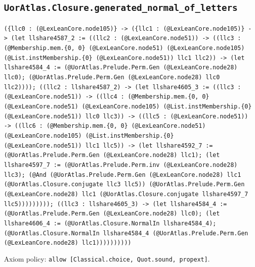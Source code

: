 \documentclass[11pt]{article}
\begin{document}
\subsection*{\texttt{UorAtlas.Closure.generated\_normal\_of\_letters}}
\noindent\texttt{(\{llc0 : (@LexLeanCore.node105)\} -> (\{llc1 : (@LexLeanCore.node105)\} -> (let llshare4587\_2 := ((llc2 : (@LexLeanCore.node51)) -> ((llc3 : (@Membership.mem.\{0, 0\} (@LexLeanCore.node51) (@LexLeanCore.node105) (@List.instMembership.\{0\} (@LexLeanCore.node51)) llc1 llc2)) -> (let llshare4584\_4 := (@UorAtlas.Prelude.Perm.Gen (@LexLeanCore.node28) llc0); (@UorAtlas.Prelude.Perm.Gen (@LexLeanCore.node28) llc0 llc2)))); ((llc2 : llshare4587\_2) -> (let llshare4605\_3 := ((llc3 : (@LexLeanCore.node51)) -> ((llc4 : (@Membership.mem.\{0, 0\} (@LexLeanCore.node51) (@LexLeanCore.node105) (@List.instMembership.\{0\} (@LexLeanCore.node51)) llc0 llc3)) -> ((llc5 : (@LexLeanCore.node51)) -> ((llc6 : (@Membership.mem.\{0, 0\} (@LexLeanCore.node51) (@LexLeanCore.node105) (@List.instMembership.\{0\} (@LexLeanCore.node51)) llc1 llc5)) -> (let llshare4592\_7 := (@UorAtlas.Prelude.Perm.Gen (@LexLeanCore.node28) llc1); (let llshare4597\_7 := (@UorAtlas.Prelude.Perm.inv (@LexLeanCore.node28) llc3); (@And (@UorAtlas.Prelude.Perm.Gen (@LexLeanCore.node28) llc1 (@UorAtlas.Closure.conjugate llc3 llc5)) (@UorAtlas.Prelude.Perm.Gen (@LexLeanCore.node28) llc1 (@UorAtlas.Closure.conjugate llshare4597\_7 llc5))))))))); ((llc3 : llshare4605\_3) -> (let llshare4584\_4 := (@UorAtlas.Prelude.Perm.Gen (@LexLeanCore.node28) llc0); (let llshare4606\_4 := (@UorAtlas.Closure.NormalIn llshare4584\_4); (@UorAtlas.Closure.NormalIn llshare4584\_4 (@UorAtlas.Prelude.Perm.Gen (@LexLeanCore.node28) llc1))))))))))}\par
\noindent Axiom policy: \texttt{allow [Classical.choice, Quot.sound, propext]}.\par
\end{document}
